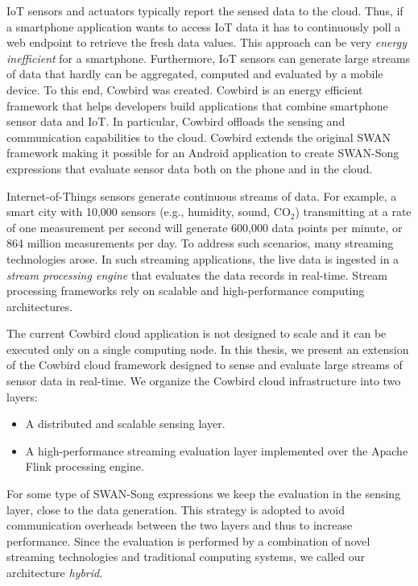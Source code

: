 IoT sensors and actuators typically report the sensed data to the cloud. Thus, if a smartphone application wants to access IoT data it has to continuously poll a web endpoint to retrieve the fresh data values. This approach can be very \emph{energy inefficient} for a smartphone. Furthermore, IoT sensors can generate large streams of data that hardly can be aggregated, computed and evaluated by a mobile device. To this end, Cowbird \cite{cowbirdarticle} was created. Cowbird is an energy efficient framework that helps developers build applications that combine smartphone sensor data and IoT. In particular, Cowbird offloads the sensing and communication capabilities to the cloud. Cowbird extends the original SWAN framework making it possible for an Android application to create SWAN-Song expressions that evaluate sensor data both on the phone and in the cloud. 

Internet-of-Things sensors generate continuous streams of data. For example, a smart city with 10,000 sensors (e.g., humidity, sound, CO$_{2}$)  transmitting at a rate of one measurement per second will generate 600,000 data points per minute, or 864 million measurements per day. To address such scenarios, many streaming technologies arose. In such streaming applications, the live data is ingested in a \emph{stream processing engine} that evaluates the data records in real-time. Stream processing frameworks rely on scalable and high-performance computing architectures. 

The current Cowbird cloud application is not designed to scale and it can be executed only on a single computing node. In this thesis, we present an extension of the Cowbird cloud framework designed to sense and evaluate large streams of sensor data in real-time. We organize the Cowbird cloud infrastructure into two layers:
\begin{itemize}
\item A distributed and scalable sensing layer.
\item A high-performance streaming evaluation layer implemented over the Apache Flink processing engine.
\end{itemize}
For some type of SWAN-Song expressions we keep the evaluation in the sensing layer, close to the data generation. This strategy is adopted to avoid communication overheads between the two layers and thus to increase performance. Since the evaluation is performed by a combination of novel streaming technologies and traditional computing systems, we called our architecture \emph{hybrid}. 

